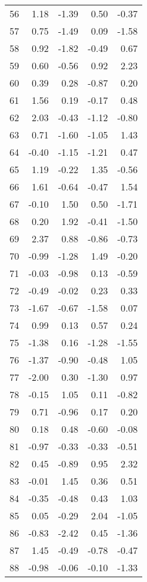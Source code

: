 \documentclass{article}\usepackage[]{graphicx}\usepackage[]{color}
\begin{document}
\begin{longtable}{rrrrr}
  56 & 1.18 & -1.39 & 0.50 & -0.37 \\ 
  57 & 0.75 & -1.49 & 0.09 & -1.58 \\ 
  58 & 0.92 & -1.82 & -0.49 & 0.67 \\ 
  59 & 0.60 & -0.56 & 0.92 & 2.23 \\ 
  60 & 0.39 & 0.28 & -0.87 & 0.20 \\ 
  61 & 1.56 & 0.19 & -0.17 & 0.48 \\ 
  62 & 2.03 & -0.43 & -1.12 & -0.80 \\ 
  63 & 0.71 & -1.60 & -1.05 & 1.43 \\ 
  64 & -0.40 & -1.15 & -1.21 & 0.47 \\ 
  65 & 1.19 & -0.22 & 1.35 & -0.56 \\ 
  66 & 1.61 & -0.64 & -0.47 & 1.54 \\ 
  67 & -0.10 & 1.50 & 0.50 & -1.71 \\ 
  68 & 0.20 & 1.92 & -0.41 & -1.50 \\ 
  69 & 2.37 & 0.88 & -0.86 & -0.73 \\ 
  70 & -0.99 & -1.28 & 1.49 & -0.20 \\ 
  71 & -0.03 & -0.98 & 0.13 & -0.59 \\ 
  72 & -0.49 & -0.02 & 0.23 & 0.33 \\ 
  73 & -1.67 & -0.67 & -1.58 & 0.07 \\ 
  74 & 0.99 & 0.13 & 0.57 & 0.24 \\ 
  75 & -1.38 & 0.16 & -1.28 & -1.55 \\ 
  76 & -1.37 & -0.90 & -0.48 & 1.05 \\ 
  77 & -2.00 & 0.30 & -1.30 & 0.97 \\ 
  78 & -0.15 & 1.05 & 0.11 & -0.82 \\ 
  79 & 0.71 & -0.96 & 0.17 & 0.20 \\ 
  80 & 0.18 & 0.48 & -0.60 & -0.08 \\ 
  81 & -0.97 & -0.33 & -0.33 & -0.51 \\ 
  82 & 0.45 & -0.89 & 0.95 & 2.32 \\ 
  83 & -0.01 & 1.45 & 0.36 & 0.51 \\ 
  84 & -0.35 & -0.48 & 0.43 & 1.03 \\ 
  85 & 0.05 & -0.29 & 2.04 & -1.05 \\ 
  86 & -0.83 & -2.42 & 0.45 & -1.36 \\ 
  87 & 1.45 & -0.49 & -0.78 & -0.47 \\ 
  88 & -0.98 & -0.06 & -0.10 & -1.33 \\ 

\end{longtable}
\end{document}
